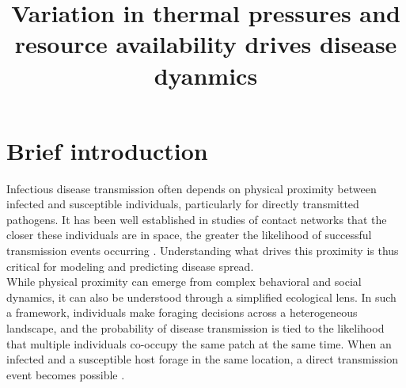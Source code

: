 
\title{Variation in thermal pressures and resource availability drives disease dyanmics}

\author[1]{
  
}
\date{}





\section*{Brief introduction}\label{s:introduction}

Infectious disease transmission often depends on physical proximity between infected and susceptible individuals, particularly for directly transmitted pathogens. It has been well established in studies of contact networks that the closer these individuals are in space, the greater the likelihood of successful transmission events occurring \citep{proffittElkDistributionSpatial2011}. Understanding what drives this proximity is thus critical for modeling and predicting disease spread. \\

While physical proximity can emerge from complex behavioral and social dynamics, it can also be understood through a simplified ecological lens. In such a framework, individuals make foraging decisions across a heterogeneous landscape, and the probability of disease transmission is tied to the likelihood that multiple individuals co-occupy the same patch at the same time. When an infected and a susceptible host forage in the same location, a direct transmission event becomes possible \citep{whiteUsingContactNetworks2017}. \\

